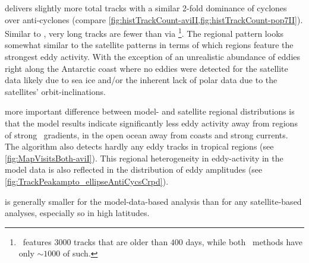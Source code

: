 \renewcommand{\run}[1]{#1-pop7II}
\renewcommand{\RUN}{pop7-\MII: }

 delivers slightly more total tracks with a similar 2-fold dominance of cyclones over anti-cyclones (compare \cref{fig:histTrackCount-aviII,fig:histTrackCount-pop7II}). Similar to \aviII, very long tracks are fewer than via \aviI \footnote{\aviI~features $3000$ tracks that are older than $400$ days, while both \MII~methods have only $\sim1000$ of such.}. The regional pattern looks somewhat similar to the satellite patterns in terms of which regions feature the strongest eddy activity. With the exception of an unrealistic abundance of eddies right along the Antarctic coast  where no eddies were detected for the satellite data likely due to sea ice and/or the inherent lack of polar data due to the satellites' orbit-inclinations.
\begin{marginfigure}
		\texttt{[image: \\run\{histTrackCount]}}
\caption[bla]{\RUN Final age distribution. x-axis: [days], Left y-axis: [1000]}
\label{\run{fig:histTrackCount}}
\end{marginfigure}

 more important difference between model- and satellite regional distributions is that the model results indicate significantly less eddy activity away from regions of strong \SSH~gradients, in the open ocean away from coasts and strong currents. The algorithm also detects hardly any eddy tracks in tropical regions (see \cref{fig:MapVisitsBoth-aviI}). This regional heterogeneity in eddy-activity in the model data is also reflected in the distribution of eddy amplitudes (see \cref{fig:TrackPeakampto_ellipseAntiCycsCrpd}).

 is generally smaller for the model-data-based analysis than for any satellite-based analyses, especially so in high latitudes.

